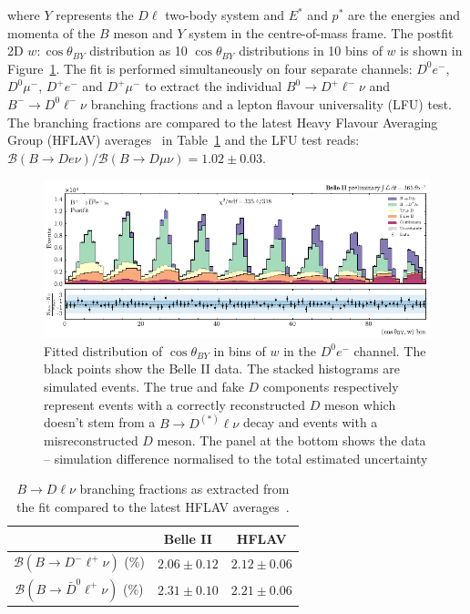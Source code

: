 \documentclass{moriond}
\def\btodlnu{B \to D\ell\nu}
\def\costby{\cos\theta_{BY}}
\begin{document}
where $Y$ represents the $D\ell$ two-body system and $E^*$ and $p^*$ are the energies and momenta of the $B$ meson and $Y$ system in the centre-of-mass frame. The postfit 2D $w:\costby$ distribution as 10 $\costby$ distributions in 10 bins of $w$ is shown in Figure~\ref{fig:2d_fit}. The fit is performed simultaneously on four separate channels: $D^0e^-$, $D^0\mu^-$, $D^+e^-$ and $D^+\mu^-$ to extract the individual $B^0 \to D^+\ell^-\nu$ and $B^- \to D^0\ell^-\nu$ branching fractions and a lepton flavour universality (LFU) test. The branching fractions are compared to the latest Heavy Flavour Averaging Group (HFLAV) averages~\cite{hflav} in Table~\ref{tab:br} and the LFU test reads: $\mathcal{B}(B \to D e \nu) / \mathcal{B}(B \to D \mu \nu) = 1.02 \pm 0.03$.
\begin{figure}[h!]
    \centering
    \includegraphics[scale=1.1]{2d_fit.pdf}
    \caption{Fitted distribution of $\costby$ in bins of $w$ in the $D^0e^-$ channel. The black points show the Belle II data. The stacked histograms are simulated events. The true and fake $D$ components respectively represent events with a correctly reconstructed $D$ meson which doesn't stem from a $B \to D^{(*)} \ell \nu$ decay and events with a misreconstructed $D$ meson. The panel at the bottom shows the data -- simulation difference normalised to the total estimated uncertainty}
    \label{fig:2d_fit}
\end{figure}
\begin{table}[h!]
    \centering
    \caption{$\btodlnu$ branching fractions as extracted from the fit compared to the latest HFLAV averages~\cite{hflav}.}
    \begin{tabular}{|c c c|}
         \hline
         & Belle II & HFLAV \\
         \hline
        $\mathcal{B}(B \to D^- \ell^+ \nu)$ (\%) & $2.06 \pm 0.12$ & $2.12 \pm 0.06$ \\
        $\mathcal{B}(B \to \bar{D}^0 \ell^+ \nu)$ (\%) & $2.31 \pm 0.10$ & $2.21 \pm 0.06$ \\
         \hline
    \end{tabular}
    \label{tab:br}
\end{table}
\end{document}
